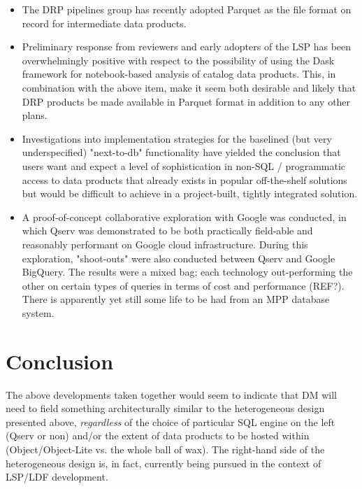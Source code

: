 \begin{itemize}

\item The DRP pipelines group has recently adopted Parquet as the file format on record for intermediate data products.

\item Preliminary response from reviewers and early adopters of the LSP has been overwhelmingly positive with respect to the possibility of using the Dask framework for notebook-based analysis of catalog data products.  This, in combination with the above item, make it seem both desirable and likely that DRP products be made available in Parquet format in addition to any other plans.

\item Investigations into implementation strategies for the baselined (but very underspecified) "next-to-db" functionality have yielded the conclusion that users want and expect a level of sophistication in non-SQL / programmatic access to data products that already exists in popular off-the-shelf solutions but would be difficult to achieve in a project-built, tightly integrated solution.

\item A proof-of-concept collaborative exploration with Google was conducted, in which Qserv was demonstrated to be both practically field-able and reasonably performant on Google cloud infrastructure.  During this exploration, "shoot-outs" were also conducted between Qserv and Google BigQuery. The results were a mixed bag; each technology out-performing the other on certain types of queries in terms of cost and performance (REF?). There is apparently yet still some life to be had from an MPP database system.

\end{itemize}

\section {Conclusion}

The above developments taken together would seem to indicate that DM will need to field something architecturally similar to the heterogeneous design presented above, \textit{regardless} of the choice of particular SQL engine on the left (Qserv or non) and/or the extent of data products to be hosted within (Object/Object-Lite vs. the whole ball of wax).  The right-hand side of the heterogeneous design is, in fact, currently being pursued in the context of LSP/LDF development.

